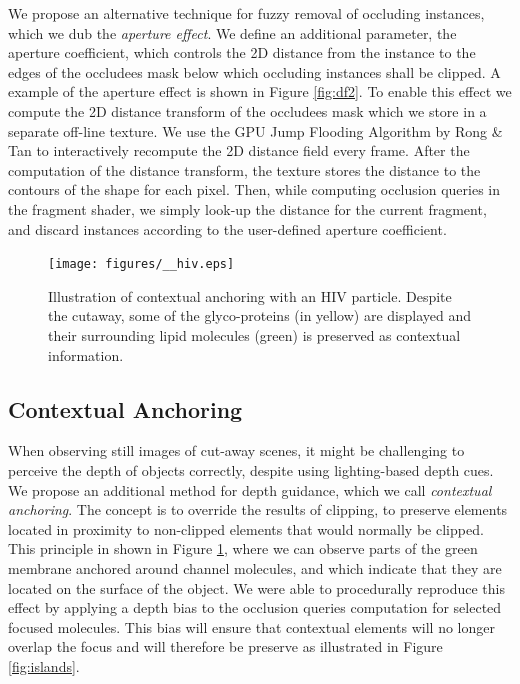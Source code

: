 We propose an alternative technique for fuzzy removal of occluding instances, which we dub the \emph{aperture effect}.
We define an additional parameter, the aperture coefficient, which controls the 2D distance from the instance to the edges of the occludees mask below which occluding instances shall be clipped.
A example of the aperture effect is shown in Figure \ref{fig:df2}.
To enable this effect we compute the 2D distance transform of the occludees mask which we store in a separate off-line texture.
We use the GPU Jump Flooding Algorithm by Rong \& Tan \cite{Rong06} to interactively recompute the 2D distance field every frame. 
After the computation of the distance transform, the texture stores the distance to the contours of the shape for each pixel.
Then, while computing occlusion queries in the fragment shader, we simply look-up the distance for the current fragment, and discard instances according to the user-defined aperture coefficient.



\begin{figure}[t]
\centering
\texttt{[image: figures/\_\_hiv.eps]}
\caption{\label{fig:hiv-islands} 
Illustration of contextual anchoring with an HIV particle. 
Despite the cutaway, some of the glyco-proteins (in yellow) are displayed and their surrounding lipid molecules (green) is preserved as contextual information.}
\vspace{-2mm}
\end{figure}

\subsection{Contextual Anchoring}
\label{ssec:anchoring}

When observing still images of cut-away scenes, it might be challenging to perceive the depth of objects correctly, despite using lighting-based depth cues.
We propose an additional method for depth guidance, which we call \emph{contextual anchoring}.
The concept is to override the results of clipping, to preserve elements located in proximity to non-clipped elements that would normally be clipped.
This principle in shown in Figure \ref{fig:hiv-islands}, where we can observe parts of the green membrane anchored around channel molecules, and which indicate that they are located on the surface of the object.
We were able to procedurally reproduce this effect by applying a depth bias to the occlusion queries computation for selected focused molecules.
This bias will ensure that contextual elements will no longer overlap the focus and will therefore be preserve as illustrated in Figure \ref{fig:islands}.



